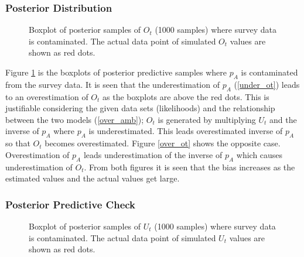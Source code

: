 \documentclass[
10pt, %
a4paper, %
oneside, %
headinclude,footinclude, %
BCOR5mm, %
]{scrartcl}
\begin{document}
\subsubsection{Posterior Distribution}

\begin{figure}[htb]
	\centering
	\caption[two early result box plots:]{Boxplot of posterior samples of $O_t$ (1000 samples) where survey data is contaminated.  The actual data point of simulated $O_t$ values are shown as red dots.}
	\label{contam_ot}
\end{figure}

\normalsize 
Figure \ref{contam_ot} is the boxplots of posterior predictive samples where $p_A$ is contaminated from the survey data. It is seen that the underestimation of $p_A$ (\ref{under_ot}) leads to an overestimation of $O_t$ as the boxplots are above the red dots. This is justifiable considering the given data sets (likelihoods) and the relationship between the two models (\ref{over_amb}); $O_t$ is generated by multiplying $U_t$ and the inverse of $p_A$ where $p_A$ is underestimated. This leads overestimated inverse of $p_A$ so that  $O_t$ becomes overestimated. Figure \ref{over_ot} shows the opposite case. Overestimation of $p_A$ leads underestimation of the inverse of $p_A$ which causes underestimation of $O_t$. From both figures it is seen that the bias increases as the estimated values and the actual values get large.\\


\subsubsection{Posterior Predictive Check}

\begin{figure}[htb]
	\centering
	\caption[two early result box plots:ut]{Boxplot of posterior samples of $U_t$ (1000 samples) where survey data is contaminated.  The actual data point of simulated $U_t$ values are shown as red dots.}
	\label{contam_ut}
\end{figure}
\end{document}
